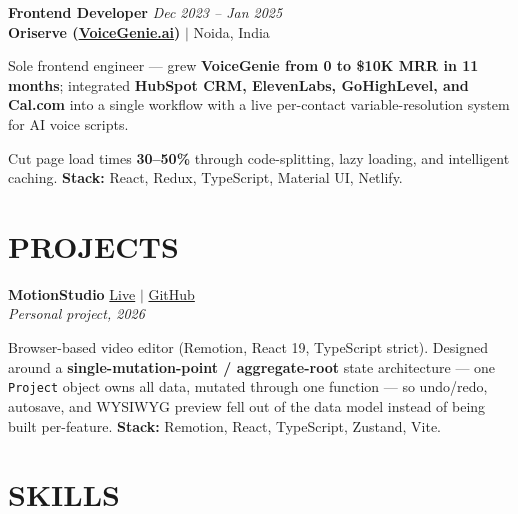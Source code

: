 \documentclass[a4paper,10pt]{article}
\begin{document}
\vspace{3pt}

\textbf{Frontend Developer} \hfill \textit{Dec 2023 -- Jan 2025}\\
\textbf{Oriserve (\href{https://voicegenie.ai/}{VoiceGenie.ai})} $|$ Noida, India

\vspace{2pt}
\begin{itemize}[leftmargin=0.15in, itemsep=1pt]
    \small{\item
    Sole frontend engineer --- grew \textbf{VoiceGenie from 0 to \$10K MRR in 11 months}; integrated \textbf{HubSpot CRM, ElevenLabs, GoHighLevel, and Cal.com} into a single workflow with a live per-contact variable-resolution system for AI voice scripts.
    }

    \small{\item
    Cut page load times \textbf{30--50\%} through code-splitting, lazy loading, and intelligent caching. \textbf{Stack:} React, Redux, TypeScript, Material UI, Netlify.
    }
\end{itemize}

\vspace{3pt}

\section{PROJECTS}

\textbf{MotionStudio} \hfill \href{https://motionstudio-six.vercel.app/}{Live} $|$ \href{https://github.com/BLAZE7SHADOW/MotionStudio}{GitHub}\\
\textit{Personal project, 2026}

\vspace{2pt}
\begin{itemize}[leftmargin=0.15in, itemsep=1pt]
    \small{\item
    Browser-based video editor (Remotion, React 19, TypeScript strict). Designed around a \textbf{single-mutation-point / aggregate-root} state architecture --- one \texttt{Project} object owns all data, mutated through one function --- so undo/redo, autosave, and WYSIWYG preview fell out of the data model instead of being built per-feature. \textbf{Stack:} Remotion, React, TypeScript, Zustand, Vite.
    }
\end{itemize}

\vspace{3pt}

\section{SKILLS}
\end{document}

